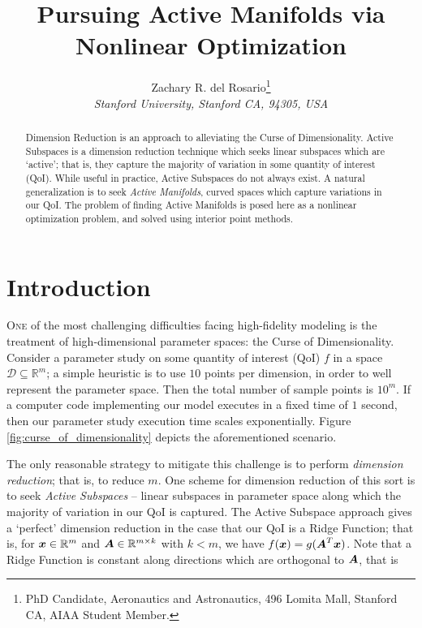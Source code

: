 \documentclass[]{aiaa-tc}%
\title{Pursuing Active Manifolds via Nonlinear Optimization}
\author{
  Zachary R. del Rosario\thanks{PhD Candidate, Aeronautics and Astronautics, 496 Lomita Mall, Stanford CA, AIAA Student Member.}\\
  {\normalsize\itshape
   Stanford University, Stanford CA, 94305, USA}\\
 }
\newcommand{\dom}{\mathcal{D}}
\begin{document}
\maketitle

\begin{abstract}
Dimension Reduction is an approach to alleviating the Curse of Dimensionality. Active Subspaces is a dimension reduction technique which seeks linear subspaces which are `active'; that is, they capture the majority of variation in some quantity of interest (QoI). While useful in practice, Active Subspaces do not always exist. A natural generalization is to seek \emph{Active Manifolds}, curved spaces which capture variations in our QoI. The problem of finding Active Manifolds is posed here as a nonlinear optimization problem, and solved using interior point methods.
\end{abstract}

\printnomenclature %

\section{Introduction} \label{sec:introduction}

\lettrine[nindent=0pt]{O}{ne} of the most challenging difficulties facing high-fidelity modeling is the treatment of high-dimensional parameter spaces: the Curse of Dimensionality. Consider a parameter study on some quantity of interest (QoI) $f$ in a space $\dom\subseteq\mathbb{R}^m$; a simple heuristic is to use $10$ points per dimension, in order to well represent the parameter space. Then the total number of sample points is $10^m$. If a computer code implementing our model executes in a fixed time of $1$ second, then our parameter study execution time scales exponentially. Figure \ref{fig:curse_of_dimensionality} depicts the aforementioned scenario.
\nomenclature{$\dom$}{Domain of $f$}%

The only reasonable strategy to mitigate this challenge is to perform \emph{dimension reduction}; that is, to reduce $m$. One scheme for dimension reduction of this sort is to seek \emph{Active Subspaces} -- linear subspaces in parameter space along which the majority of variation in our QoI is captured. \cite{constantine2015} The Active Subspace approach gives a `perfect' dimension reduction in the case that our QoI is a Ridge Function; that is, for $\boldsymbol{x}\in\mathbb{R}^m$ and $\boldsymbol{A}\in\mathbb{R}^{m\times k}$ with $k<m$, we have $f(\boldsymbol{x})=g(\boldsymbol{A}^T\boldsymbol{x})$. Note that a Ridge Function is constant along directions which are orthogonal to $\boldsymbol{A}$, that is
\end{document}

